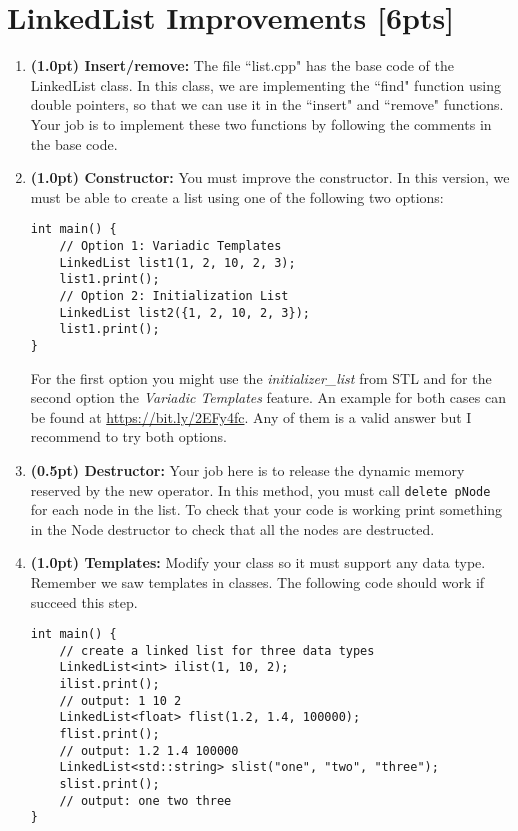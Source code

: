 \documentclass{article}
\begin{document}
\section{LinkedList Improvements [6pts]}

\begin{enumerate}[label=\Alph*]
  \item \textbf{(1.0pt) Insert/remove:} The file ``list.cpp" has the base code of the LinkedList class. In this class, we are implementing the ``find" function using double pointers, so that we can use it in the ``insert" and ``remove" functions. Your job is to implement these two functions by following the comments in the base code.
  
  
  \item \textbf{(1.0pt) Constructor:} You must improve the constructor. In this version, we must be able to create a list using one of the following two options:
  
\begin{lstlisting}
int main() {
    // Option 1: Variadic Templates
    LinkedList list1(1, 2, 10, 2, 3);
    list1.print();
    // Option 2: Initialization List
    LinkedList list2({1, 2, 10, 2, 3});
    list1.print();
}
\end{lstlisting}

 For the first option you might use the \emph{initializer\_list} from STL and for the second option the \emph{Variadic Templates} feature. An example for both cases can be found at \url{https://bit.ly/2EFy4fc}. Any of them is a valid answer but I recommend to try both options. 
  
  \item \textbf{(0.5pt) Destructor:} Your job here is to release the dynamic memory reserved by the new operator. In this method, you must call \lstinline|delete pNode| for each node in the list. To check that your code is working print something in the Node destructor to check that all the nodes are destructed.
  
  \item \textbf{(1.0pt) Templates:} Modify your class so it must support any data type. Remember we saw templates in classes. The following code should work if succeed this step.
  
\begin{lstlisting}
int main() {
    // create a linked list for three data types
    LinkedList<int> ilist(1, 10, 2);
    ilist.print();
    // output: 1 10 2 
    LinkedList<float> flist(1.2, 1.4, 100000);
    flist.print();
    // output: 1.2 1.4 100000 
    LinkedList<std::string> slist("one", "two", "three");
    slist.print();
    // output: one two three 
}
\end{lstlisting}
  

\end{enumerate}
\end{document}
